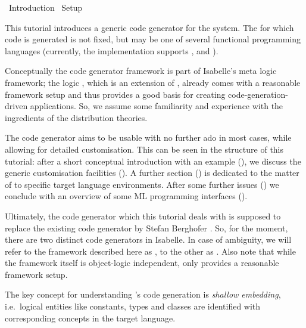 %
\begin{isabellebody}%
\def\isabellecontext{Introduction}%
%
\isadelimtheory
%
\endisadelimtheory
%
\isatagtheory
{}\isamarkupfalse%
\ Introduction\isanewline
{}\ Setup\isanewline
{}%
\endisatagtheory
{\isafoldtheory}%
%
\isadelimtheory
%
\endisadelimtheory
%
\isamarkuptrue%
%
\begin{isamarkuptext}%
This tutorial introduces a generic code generator for the
   system.
  The
   for which code is
  generated is not fixed, but may be one of several
  functional programming languages (currently, the implementation
  supports  \cite{SML},  \cite{OCaml} and 
  \cite{haskell-revised-report}).

  Conceptually the code generator framework is part
  of Isabelle's \hyperlink{theory.Pure}{\mbox{}} meta logic framework; the logic
  \hyperlink{theory.HOL}{\mbox{}} \cite{isa-tutorial}, which is an extension of \hyperlink{theory.Pure}{\mbox{}},
  already comes with a reasonable framework setup and thus provides
  a good basis for creating code-generation-driven
  applications.  So, we assume some familiarity and experience
  with the ingredients of the \hyperlink{theory.HOL}{\mbox{}} distribution theories.

  The code generator aims to be usable with no further ado
  in most cases, while allowing for detailed customisation.
  This can be seen in the structure of this tutorial: after a short
  conceptual introduction with an example (),
  we discuss the generic customisation facilities ().
  A further section () is dedicated to the matter of
   to specific target language environments.  After some
  further issues () we conclude with an overview
  of some ML programming interfaces ().

  \begin{warn}
    Ultimately, the code generator which this tutorial deals with
    is supposed to replace the existing code generator
    by Stefan Berghofer \cite{Berghofer-Nipkow:2002}.
    So, for the moment, there are two distinct code generators
    in Isabelle.  In case of ambiguity, we will refer to the framework
    described here as , to the
    other as .
    Also note that while the framework itself is
    object-logic independent, only \hyperlink{theory.HOL}{\mbox{}} provides a reasonable
    framework setup.    
  \end{warn}%
\end{isamarkuptext}%
\isamarkuptrue%
%
\isamarkuptrue%
%
\begin{isamarkuptext}%
The key concept for understanding 's code generation is
  \emph{shallow embedding}, i.e.~logical entities like constants, types and
  classes are identified with corresponding concepts in the target language.


\end{isamarkuptext}
\end{isabellebody}
